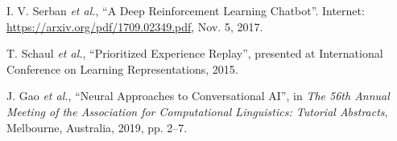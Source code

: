 \begin{thebibliography}{99}
I. V. Serban \textit{et al.}, \enquote{A Deep Reinforcement Learning Chatbot}.
Internet: \url{https://arxiv.org/pdf/1709.02349.pdf}, Nov. 5, 2017.

T. Schaul \textit{et al.}, \enquote{Prioritized Experience Replay},
presented at International Conference on Learning Representations, 2015.

J. Gao \textit{et al.}, \enquote{Neural Approaches to Conversational AI},
in \textit{The 56th Annual Meeting of the Association for Computational Linguistics: Tutorial Abstracts},
Melbourne, Australia, 2019, pp. 2–7.

\end{thebibliography}
